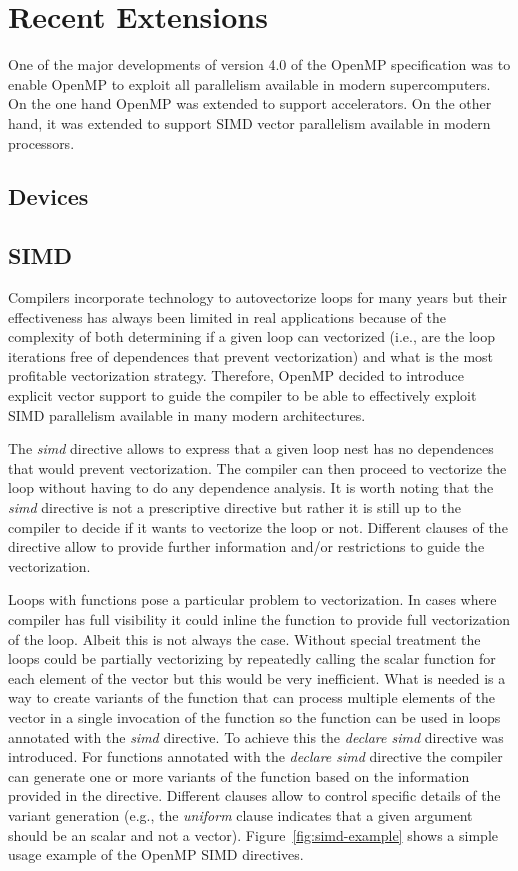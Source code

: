\section{Recent Extensions}
\label{sec:recent_extensions}

One of the major developments of version 4.0 of the OpenMP specification was to enable OpenMP to exploit all parallelism available in modern supercomputers. On the one hand OpenMP was extended to support accelerators. On the other hand, it was extended to support SIMD vector parallelism available in modern processors. 

\subsection{Devices}
\label{sub:devices}

\subsection{SIMD}
\label{sub:simd}

Compilers incorporate technology to autovectorize loops for many years but their
effectiveness has always been limited in real applications because of the
complexity of both determining if a given loop can vectorized (i.e., are the
loop iterations free of dependences that prevent vectorization) and what is the
most profitable vectorization strategy. Therefore, OpenMP decided to introduce
explicit vector support to guide the compiler to be able to effectively exploit
SIMD parallelism available in many modern architectures.

The \emph{simd} directive allows to express that a given loop nest has no
dependences that would prevent vectorization. The compiler can then proceed to
vectorize the loop without having to do any dependence analysis. It is worth
noting that the \emph{simd} directive is not a prescriptive directive but rather
it is still up to the compiler to decide if it wants to vectorize the loop or
not. Different clauses of the directive allow to provide further information
and/or restrictions to guide the vectorization.

Loops with functions pose a particular problem to vectorization. In cases where
compiler has full visibility it could inline the function to provide full
vectorization of the loop. Albeit this is not always the case. Without special
treatment the loops could be partially vectorizing by repeatedly calling the
scalar function for each element of the vector but this would be very
inefficient. What is needed is a way to create variants of the function that can
process multiple elements of the vector in a single invocation of the function
so the function can be used in loops annotated with the \emph{simd} directive.
To achieve this the \emph{declare simd} directive was introduced. For functions
annotated with the \emph{declare simd} directive the compiler can generate one
or more variants of the function based on the information provided in the
directive. Different clauses allow to control specific details of the variant
generation (e.g., the \emph{uniform} clause indicates that a given argument
should be an scalar and not a vector). Figure~\ref{fig:simd-example} shows a
simple usage example of the OpenMP SIMD directives.

